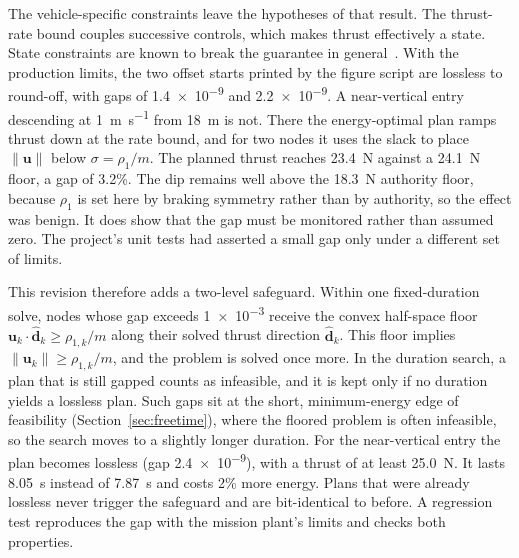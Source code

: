 \documentclass[journal]{IEEEtran}
\newcommand{\refsec}[1]{Section~\ref{#1}}
\newcommand{\vect}[1]{\bm{#1}}
\begin{document}
The vehicle-specific constraints leave the hypotheses of that result.
The thrust-rate bound couples successive controls, which makes thrust effectively a state.
State constraints are known to break the guarantee in general~\cite{harris2014lcvx}.
With the production limits, the two offset starts printed by the figure script are lossless to round-off, with gaps of \num{1.4e-9} and \num{2.2e-9}.
A near-vertical entry descending at \SI{1}{\metre\per\second} from \SI{18}{\metre} is not.
There the energy-optimal plan ramps thrust down at the rate bound, and for two nodes it uses the slack to place $\|\vect{u}\|$ below $\sigma = \rho_1/m$.
The planned thrust reaches \SI{23.4}{\newton} against a \SI{24.1}{\newton} floor, a gap of 3.2\%.
The dip remains well above the \SI{18.3}{\newton} authority floor, because $\rho_1$ is set here by braking symmetry rather than by authority, so the effect was benign.
It does show that the gap must be monitored rather than assumed zero.
The project's unit tests had asserted a small gap only under a different set of limits.

This revision therefore adds a two-level safeguard.
Within one fixed-duration solve, nodes whose gap exceeds \num{1e-3} receive the convex half-space floor $\vect{u}_k\cdot\hat{\vect{d}}_k \ge \rho_{1,k}/m$ along their solved thrust direction $\hat{\vect{d}}_k$.
This floor implies $\|\vect{u}_k\| \ge \rho_{1,k}/m$, and the problem is solved once more.
In the duration search, a plan that is still gapped counts as infeasible, and it is kept only if no duration yields a lossless plan.
Such gaps sit at the short, minimum-energy edge of feasibility (\refsec{sec:freetime}), where the floored problem is often infeasible, so the search moves to a slightly longer duration.
For the near-vertical entry the plan becomes lossless (gap \num{2.4e-9}), with a thrust of at least \SI{25.0}{\newton}.
It lasts \SI{8.05}{\second} instead of \SI{7.87}{\second} and costs 2\% more energy.
Plans that were already lossless never trigger the safeguard and are bit-identical to before.
A regression test reproduces the gap with the mission plant's limits and checks both properties.
\end{document}
